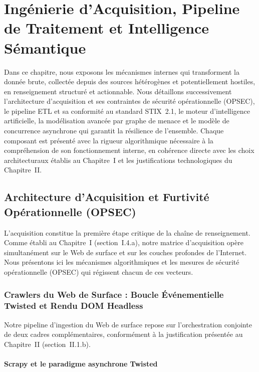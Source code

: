 ﻿\chapter{Ingénierie d'Acquisition, Pipeline de Traitement et Intelligence Sémantique}

Dans ce chapitre, nous exposons les mécanismes internes qui transforment la donnée brute, collectée depuis des sources hétérogènes et potentiellement hostiles, en renseignement structuré et actionnable. Nous détaillons successivement l'architecture d'acquisition et ses contraintes de sécurité opérationnelle (OPSEC), le pipeline ETL et sa conformité au standard STIX~2.1, le moteur d'intelligence artificielle, la modélisation avancée par graphe de menace et le modèle de concurrence asynchrone qui garantit la résilience de l'ensemble. Chaque composant est présenté avec la rigueur algorithmique nécessaire à la compréhension de son fonctionnement interne, en cohérence directe avec les choix architecturaux établis au Chapitre~I et les justifications technologiques du Chapitre~II.

\section{Architecture d'Acquisition et Furtivité Opérationnelle (OPSEC)}

L'acquisition constitue la première étape critique de la chaîne de renseignement. Comme établi au Chapitre~I (section~I.4.a), notre matrice d'acquisition opère simultanément sur le Web de surface et sur les couches profondes de l'Internet. Nous présentons ici les mécanismes algorithmiques et les mesures de sécurité opérationnelle (OPSEC) qui régissent chacun de ces vecteurs.

\subsection{Crawlers du Web de Surface : Boucle Événementielle Twisted et Rendu DOM Headless}

Notre pipeline d'ingestion du Web de surface repose sur l'orchestration conjointe de deux cadres complémentaires, conformément à la justification présentée au Chapitre~II (section~II.1.b).

\subsubsection{Scrapy et le paradigme asynchrone Twisted}

